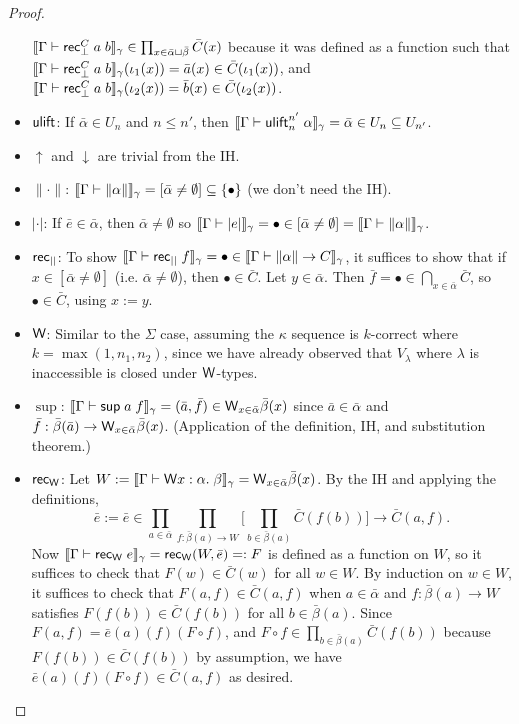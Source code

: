 \begin{proof}
\begin{itemize}
$\scott{\Gamma\vdash\rec^C_\bot\;a\;b}_\gamma\in\prod_{x\in\bar\alpha\sqcup\bar\beta}\bar C(x)$ because it was defined as a function such that $\scott{\Gamma\vdash\rec^C_\bot\;a\;b}_\gamma(\iota_1(x))=\bar a(x)\in\bar C(\iota_1(x))$, and $\scott{\Gamma\vdash\rec^C_\bot\;a\;b}_\gamma(\iota_2(x))=\bar b(x)\in\bar C(\iota_2(x))$.
\item $\mathsf{ulift}$: If $\bar\alpha\in U_n$ and $n\le n'$, then $\scott{\Gamma\vdash\ulift_n^{n'}\;\alpha}_\gamma=\bar\alpha\in U_n\subseteq U_{n'}$.
\item $\uparrow$ and $\downarrow$ are trivial from the IH.
\item $\|\cdot\|$: $\scott{\Gamma\vdash\|\alpha\|}_\gamma=[\bar\alpha\ne\emptyset]\subseteq\{\bullet\}$ (we don't need the IH).
\item $|\cdot|$: If $\bar e\in\bar\alpha$, then $\bar\alpha\ne\emptyset$ so $\scott{\Gamma\vdash|e|}_\gamma=\bullet\in[\bar\alpha\ne\emptyset]=\scott{\Gamma\vdash\|\alpha\|}_\gamma$.
\item $\mathsf{rec}_{||}$: To show $\scott{\Gamma\vdash\rec_{||}\;f}_\gamma=\bullet\in\scott{\Gamma\vdash\|\alpha\|\to C}_\gamma$, it suffices to show that if $x\in[\bar\alpha\ne\emptyset]$ (i.e. $\bar\alpha\ne\emptyset$), then $\bullet\in\bar C$. Let $y\in\bar\alpha$. Then $\bar f=\bullet\in\bigcap_{x\in\bar\alpha}\bar C$, so $\bullet\in\bar C$, using $x:=y$.
\item $\mathsf{W}$: Similar to the $\Sigma$ case, assuming the $\kappa$ sequence is $k$-correct where $k=\max(1,n_1,n_2)$, since we have already observed that $V_\lambda$ where $\lambda$ is inaccessible is closed under $\mathsf{W}$-types.
\item $\sup$: $\scott{\Gamma\vdash \sup a\;f}_\gamma=(\bar a,\bar f)\in\W_{x\in\bar\alpha}\bar\beta(x)$ since $\bar a\in\bar\alpha$ and $\bar f:\bar\beta(\bar a)\to\mathsf{W}_{x\in\bar\alpha}\bar\beta(x)$. (Application of the definition, IH, and substitution theorem.)
\item $\mathsf{rec}_{\mathsf{W}}$: Let $W:=\scott{\Gamma\vdash\W x:\alpha.\;\beta}_\gamma=\W_{x\in\bar\alpha}\bar\beta(x)$. By the IH and applying the definitions, $$\bar e:=\bar e\in\prod_{a\in\bar\alpha}\prod_{f:\bar\beta(a)\to W}\Big[\prod_{b\in\bar\beta(a)}\bar C(f(b))\Big]\to \bar C(a,f).$$
Now $\scott{\Gamma\vdash \rec_\W\;e}_\gamma=\rec_\W(W,\bar e)=:F$ is defined as a function on $W$, so it suffices to check that $F(w)\in\bar C(w)$ for all $w\in W$. By induction on $w\in W$, it suffices to check that $F(a,f)\in\bar C(a,f)$ when $a\in\bar\alpha$ and $f:\bar\beta(a)\to W$ satisfies $F(f(b))\in\bar C(f(b))$ for all $b\in\bar\beta(a)$. Since $F(a,f)=\bar e(a)(f)(F\circ f)$, and $F\circ f\in \prod_{b\in\bar\beta(a)}\bar C(f(b))$ because $F(f(b))\in\bar C(f(b))$ by assumption, we have $\bar e(a)(f)(F\circ f)\in\bar C(a,f)$ as desired.

\end{itemize}
\end{proof}
